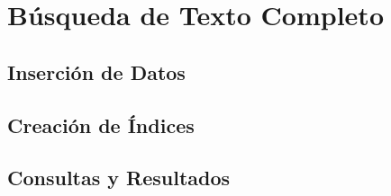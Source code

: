 \section{Búsqueda de Texto Completo}

\subsection{Inserción de Datos}

\subsection{Creación de Índices}

\subsection{Consultas y Resultados}